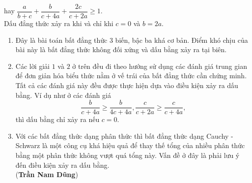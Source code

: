 \begin{bt}
{		hay $\dfrac{a}{b+c} + \dfrac{b}{c+4a} + \dfrac{2c}{c+2a} \ge 1.$\\
		Dấu đẳng thức xảy ra khi và chỉ khi $c =0$ và $b=2a$.
	\begin{nx}\hfill
	\begin{enumerate}[\bf 1.]
		\item Đây là bài toán bất đẳng thức $3$ biến, bậc ba khá cơ bản. Điểm khó chịu của bài này là bất đẳng thức không đối xứng và dấu bằng xảy ra tại biên.
		\item Các lời giải $1$ và $2$ ở trên đều đi theo hướng sử dụng các đánh giá trung gian để đơn giản hóa biểu thức nằm ở vế trái của bất đẳng thức cần chứng minh. Tất cả các đánh giá này đều được thực hiện dựa vào điều kiện xảy ra dấu bằng. Ví dụ như ở các đánh giá 
		$$ \dfrac{b}{c+4a} \ge \dfrac{b}{4c + 4a}, \dfrac{c}{c+2a} \ge \dfrac{c}{c+4a},$$
		thì dấu bằng chỉ xảy ra nếu $c=0$.
		\item Với các bất đẳng thức dạng phân thức thì bất đẳng thức dạng Cauchy - Schwarz là một công cụ khá hiệu quả để thay thế tổng của nhiều phân thức bằng một phân thức không vượt quá tổng này. Vấn đề ở đây là phải lưu ý đến điều kiện xảy ra dấu bằng.\\
		({\bf Trần Nam Dũng})
	\end{enumerate}
\end{nx}	}
\end{bt}
